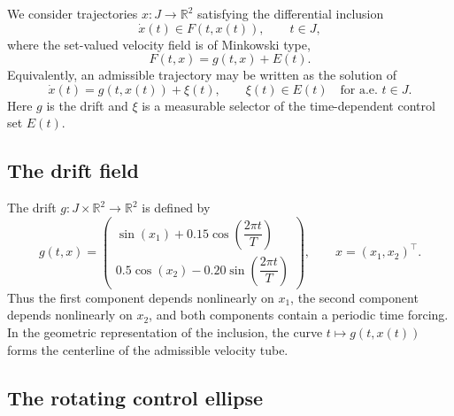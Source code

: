 \documentclass[11pt]{article}
\theoremstyle{definition}
\theoremstyle{remark}
\newcommand{\R}{\mathbb{R}}
\begin{document}
We consider trajectories $x:J\to\R^2$ satisfying the differential inclusion
\begin{equation}
    \dot{x}(t)\in F(t,x(t)), \qquad t\in J,
    \label{eq:main-inclusion}
\end{equation}
where the set-valued velocity field is of Minkowski type,
\begin{equation}
    F(t,x)=g(t,x)+E(t).
    \label{eq:minkowski-field}
\end{equation}
Equivalently, an admissible trajectory may be written as the solution of
\begin{equation}
    \dot{x}(t)=g(t,x(t))+\xi(t), \qquad \xi(t)\in E(t) \quad \text{for a.e. }t\in J.
    \label{eq:controlled-ode}
\end{equation}
Here $g$ is the drift and $\xi$ is a measurable selector of the time-dependent control set $E(t)$.

\subsection{The drift field}

The drift $g:J\times\R^2\to\R^2$ is defined by
\begin{equation}
    g(t,x)=
    \begin{pmatrix}
    \sin(x_1)+0.15\cos\left(\dfrac{2\pi t}{T}\right)\\[2mm]
    0.5\cos(x_2)-0.20\sin\left(\dfrac{2\pi t}{T}\right)
    \end{pmatrix},
    \qquad x=(x_1,x_2)^{\top}.
    \label{eq:drift}
\end{equation}
Thus the first component depends nonlinearly on $x_1$, the second component depends nonlinearly on $x_2$, and both components contain a periodic time forcing. In the geometric representation of the inclusion, the curve $t\mapsto g(t,x(t))$ forms the centerline of the admissible velocity tube.

\subsection{The rotating control ellipse}
\end{document}
